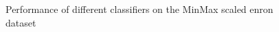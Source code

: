 \documentclass[12pt]{article}%
\begin{document}
\begin{figure}[!htbp]
\centering
  \hfill
  \caption{Performance of different classifiers on the MinMax scaled enron dataset}
\end{figure}
\end{document}
